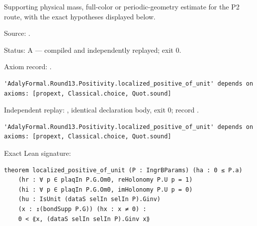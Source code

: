 \begin{theorem}[bp-465]
\label{bp-465}
\leanok
Supporting physical mass, full-color or periodic-geometry estimate for the P2 route, with the exact hypotheses displayed below.

\par Source: \texttt{}.
\par Status: A — compiled and independently replayed; exit 0.
\par Axiom record: \texttt{}.
\begin{verbatim}
'AdalyFormal.Round13.Positivity.localized_positive_of_unit' depends on axioms: [propext, Classical.choice, Quot.sound]
\end{verbatim}
\par Independent replay: \texttt{}, identical declaration body, exit 0; record \texttt{}.
\begin{verbatim}
'AdalyFormal.Round13.Positivity.localized_positive_of_unit' depends on axioms: [propext, Classical.choice, Quot.sound]
\end{verbatim}
\par Exact Lean signature:
\begin{verbatim}
theorem localized_positive_of_unit (P : IngrBParams) (ha : 0 ≤ P.a)
    (hr : ∀ p ∈ plaqIn P.G.Om0, reHolonomy P.U p = 1)
    (hi : ∀ p ∈ plaqIn P.G.Om0, imHolonomy P.U p = 0)
    (hu : IsUnit (dataS selIn selIn P).Ginv)
    (x : ↥(bondSupp P.G)) (hx : x ≠ 0) :
    0 < ⟪x, (dataS selIn selIn P).Ginv x⟫
\end{verbatim}
\end{theorem}

